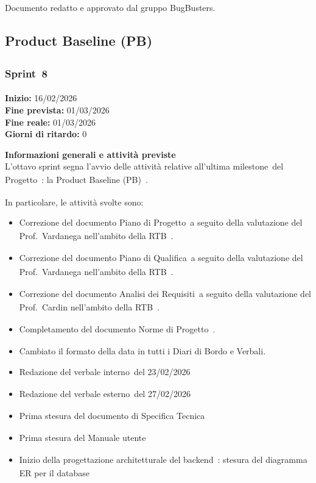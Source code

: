 \documentclass[a4paper,12pt]{article}
\newcommand{\pediceG}{\texorpdfstring{\textsubscript{\scalebox{0.6}{\textbf{G}}}~}{G}}
\begin{document}
\vfill
\begin{center}
    {\small\color{darkgray} Documento redatto e approvato dal gruppo BugBusters.}
\end{center}

\newpage
\subsection{Product Baseline (PB)\pediceG}
\subsubsection{Sprint\pediceG 8}

\textbf{Inizio:} 16/02/2026 \\
\textbf{Fine prevista:} 01/03/2026 \\
\textbf{Fine reale:} 01/03/2026 \\
\textbf{Giorni di ritardo:} 0

\noindent\textbf{Informazioni generali e attività previste}\\
L'ottavo sprint segna l'avvio delle attività relative all'ultima milestone\pediceG del Progetto\pediceG: la Product Baseline (PB)\pediceG.

In particolare, le attività svolte sono:
\begin{itemize}
\item Correzione del documento Piano di Progetto\pediceG a seguito della valutazione del Prof.\ Vardanega nell'ambito della RTB\pediceG.
\item Correzione del documento Piano di Qualifica\pediceG a seguito della valutazione del Prof.\ Vardanega nell'ambito della RTB\pediceG.
\item Correzione del documento Analisi dei Requisiti\pediceG a seguito della valutazione del Prof.\ Cardin nell'ambito della RTB\pediceG.
\item Completamento del documento Norme di Progetto\pediceG.
\item Cambiato il formato della data in tutti i Diari di Bordo e Verbali.
\item Redazione del verbale interno\pediceG del 23/02/2026
\item Redazione del verbale esterno\pediceG del 27/02/2026
\item Prima stesura  del documento di Specifica Tecnica\pediceG
\item Prima stesura  del  Manuale utente\pediceG
\item Inizio della progettazione architetturale del backend\pediceG: stesura del diagramma ER per il database

\end{itemize}
\end{document}
